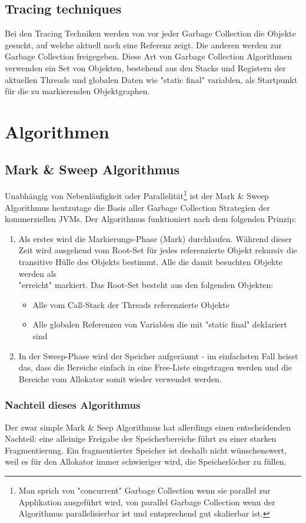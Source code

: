 \subsection{Tracing techniques\cite[S. 77]{lagergren2010oracle}}
Bei den Tracing Techniken werden von vor jeder Garbage Collection die Objekte gesucht, auf welche aktuell noch eine Referenz zeigt. Die anderen werden zur Garbage Collection freigegeben. Diese Art von Garbage Collection Algorithmen verwenden ein Set von Objekten, bestehend aus den Stacks und Registern der aktuellen Threads und globalen Daten wie "static final" variablen, als Startpunkt für die zu markierenden Objektgraphen. 


\section{Algorithmen}
\subsection{Mark \& Sweep Algorithmus}
Unabhängig von Nebenläufigkeit oder Parallelität\footnote{Man sprich von "concurrent" Garbage Collection wenn sie parallel zur Applikation ausgeführt wird, von parallel Garbage Collection wenn der Algorithmus parallelisierbar ist und entsprechend gut skalierbar ist.} ist der Mark \& Sweep Algorithmus heutzutage die Basis aller Garbage Collection Strategien der kommerziellen JVMs. Der Algorithmus funktioniert nach dem folgenden Prinzip:
\begin{enumerate}
	\item Als erstes wird die Markierungs-Phase (Mark) durchlaufen. Während dieser Zeit wird ausgehend vom Root-Set für jedes referenzierte Objekt rekursiv die transitive Hülle des Objekts bestimmt. Alle die damit besuchten Objekte werden als \\"erreicht" markiert. Das Root-Set besteht aus den folgenden Objekten:
	\begin{itemize}
		\item Alle vom Call-Stack der Threads referenzierte Objekte
		\item Alle globalen Referenzen von Variablen die mit "static final" deklariert sind
	\end{itemize}
	\item In der Sweep-Phase wird der Speicher aufgeräumt - im einfachsten Fall heisst das, dass die Bereiche einfach in eine Free-Liste eingetragen werden und die Bereiche vom Allokator somit wieder verwendet werden.
\end{enumerate}

\subsubsection{Nachteil dieses Algorithmus}
Der zwar simple Mark \& Seep Algorithmus hat allerdings einen entscheidenden Nachteil: eine alleinige Freigabe der Speicherbereiche führt zu einer starken Fragmentierung. Ein fragmentierter Speicher ist deshalb nicht wünschenswert, weil es für den Allokator immer schwieriger wird, die Speicherlöcher zu füllen.
